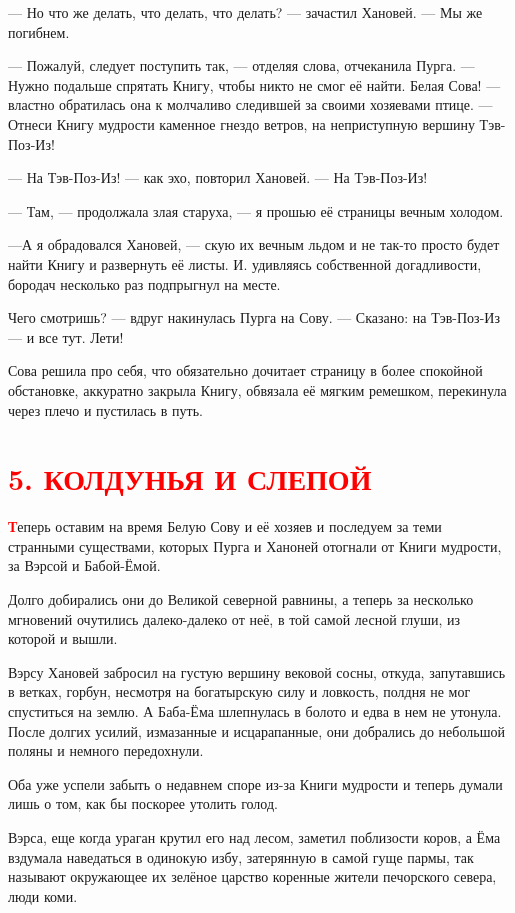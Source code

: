 \documentclass[12pt, a4paper, openany]{book}
\begin{document}
	— Но что же делать, что делать, что делать? — зачастил Хановей. — Мы же погибнем.
	
	— Пожалуй, следует поступить так, — отделяя слова, отчеканила Пурга. — Нужно подальше спрятать Книгу, чтобы никто не смог её найти. Белая Сова! — властно обратилась она к молчаливо следившей за своими хозяевами птице. — Отнеси Книгу мудрости каменное гнездо ветров, на неприступную вершину Тэв-Поз-Из!
	
	— На Тэв-Поз-Из! — как эхо, повторил Хановей. — На Тэв-Поз-Из!
	
	— Там, — продолжала злая старуха, — я прошью её страницы вечным холодом.
	
	—А я обрадовался Хановей, — скую их вечным льдом и не так-то просто будет найти Книгу и развернуть её листы. И. удивляясь собственной догадливости, бородач несколько раз подпрыгнул на месте.
	
	Чего смотришь? — вдруг накинулась Пурга на Сову. — Сказано: на Тэв-Поз-Из — и все тут. Лети!
	
	Сова решила про себя, что обязательно дочитает страницу в более спокойной обстановке, аккуратно закрыла Книгу, обвязала её мягким ремешком, перекинула через плечо и пустилась в путь.
	
		\section[5. Колдунья и слепой]{\center \textcolor{red}{5. КОЛДУНЬЯ И СЛЕПОЙ}}

	
	\lettrine[findent=0pt]{\textbf{\textcolor{red}{Т}}}{}еперь оставим на время Белую Сову и её хозяев и последуем за теми странными существами, которых Пурга и Ханоней отогнали от Книги мудрости, за Вэрсой и Бабой-Ёмой.
	
	Долго добирались они до Великой северной равнины, а теперь за несколько мгновений очутились далеко-далеко от неё, в той самой лесной глуши, из которой и вышли.
	
	Вэрсу Хановей забросил на густую вершину вековой сосны, откуда, запутавшись в ветках, горбун, несмотря на богатырскую силу и ловкость, полдня не мог спуститься на землю. А Баба-Ёма шлепнулась в болото и едва в нем не утонула. После долгих усилий, измазанные и исцарапанные, они добрались до небольшой поляны и немного передохнули.
	
	Оба уже успели забыть о недавнем споре из-за Книги мудрости и теперь думали лишь о том, как бы поскорее утолить голод.
	
	Вэрса, еще когда ураган крутил его над лесом, заметил поблизости коров, а Ёма вздумала наведаться в одинокую избу, затерянную в самой гуще пармы, так называют окружающее их зелёное царство коренные жители печорского севера, люди коми.
	
\end{document}
